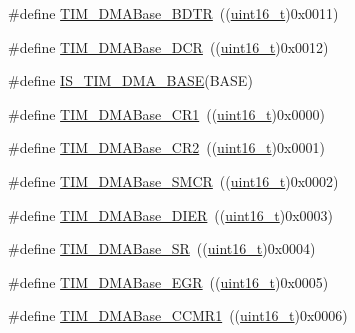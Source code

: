 \begin{DoxyCompactItemize}
\item 
\#define \hyperlink{group___t_i_m___d_m_a___base__address_gaaff22bbf3091c47783c1c68b648c8605}{T\+I\+M\+\_\+\+D\+M\+A\+Base\+\_\+\+B\+D\+TR}~((\hyperlink{_p_e___types_8h_a1f1825b69244eb3ad2c7165ddc99c956}{uint16\+\_\+t})0x0011)
\item 
\#define \hyperlink{group___t_i_m___d_m_a___base__address_ga59e2206e4e03b9d55c9fb5a24e29b01c}{T\+I\+M\+\_\+\+D\+M\+A\+Base\+\_\+\+D\+CR}~((\hyperlink{_p_e___types_8h_a1f1825b69244eb3ad2c7165ddc99c956}{uint16\+\_\+t})0x0012)
\item 
\#define \hyperlink{group___t_i_m___d_m_a___base__address_gaf565551f2619b1368fed7ef1ba7414de}{I\+S\+\_\+\+T\+I\+M\+\_\+\+D\+M\+A\+\_\+\+B\+A\+SE}(B\+A\+SE)
\item 
\#define \hyperlink{group___t_i_m___d_m_a___base__address_ga73bca5b14da2d5026fa3877d0db53740}{T\+I\+M\+\_\+\+D\+M\+A\+Base\+\_\+\+C\+R1}~((\hyperlink{_p_e___types_8h_a1f1825b69244eb3ad2c7165ddc99c956}{uint16\+\_\+t})0x0000)
\item 
\#define \hyperlink{group___t_i_m___d_m_a___base__address_ga50e894f0d2cecc1ff3a3578098c3246e}{T\+I\+M\+\_\+\+D\+M\+A\+Base\+\_\+\+C\+R2}~((\hyperlink{_p_e___types_8h_a1f1825b69244eb3ad2c7165ddc99c956}{uint16\+\_\+t})0x0001)
\item 
\#define \hyperlink{group___t_i_m___d_m_a___base__address_ga748e24ac0675caa55869d6ba506448df}{T\+I\+M\+\_\+\+D\+M\+A\+Base\+\_\+\+S\+M\+CR}~((\hyperlink{_p_e___types_8h_a1f1825b69244eb3ad2c7165ddc99c956}{uint16\+\_\+t})0x0002)
\item 
\#define \hyperlink{group___t_i_m___d_m_a___base__address_gaeddacbbc2adf9705feac250f077d8c93}{T\+I\+M\+\_\+\+D\+M\+A\+Base\+\_\+\+D\+I\+ER}~((\hyperlink{_p_e___types_8h_a1f1825b69244eb3ad2c7165ddc99c956}{uint16\+\_\+t})0x0003)
\item 
\#define \hyperlink{group___t_i_m___d_m_a___base__address_ga5cda07a11a76bbb24a7d5bb680814d31}{T\+I\+M\+\_\+\+D\+M\+A\+Base\+\_\+\+SR}~((\hyperlink{_p_e___types_8h_a1f1825b69244eb3ad2c7165ddc99c956}{uint16\+\_\+t})0x0004)
\item 
\#define \hyperlink{group___t_i_m___d_m_a___base__address_gab5e6f6c3fea100896d13ce317a6ccd8e}{T\+I\+M\+\_\+\+D\+M\+A\+Base\+\_\+\+E\+GR}~((\hyperlink{_p_e___types_8h_a1f1825b69244eb3ad2c7165ddc99c956}{uint16\+\_\+t})0x0005)
\item 
\#define \hyperlink{group___t_i_m___d_m_a___base__address_gaab384496cff3e54d8179fc0db727c7ee}{T\+I\+M\+\_\+\+D\+M\+A\+Base\+\_\+\+C\+C\+M\+R1}~((\hyperlink{_p_e___types_8h_a1f1825b69244eb3ad2c7165ddc99c956}{uint16\+\_\+t})0x0006)

\end{DoxyCompactItemize}
